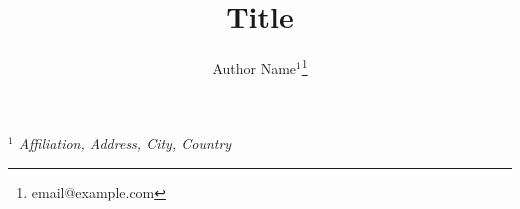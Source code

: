 \title{\textbf{Title}}

\author{
Author Name${}^{1}$\footnote{email@example.com} \\
}

\date{}

\maketitle

\begin{center}
\begin{center}
{\it
$^{1}$ Affiliation, Address, City, Country
}
\end{center}

\vspace{10mm}
\end{center}